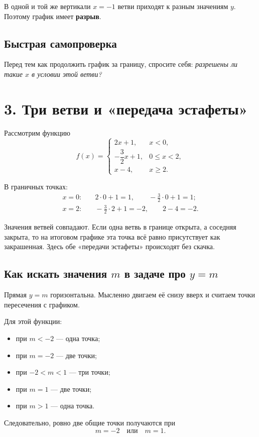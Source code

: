 \documentclass[a4paper,12pt]{article}
\newcommand{\sectionline}{\par\vspace{1mm}{\color{accent}\rule{\linewidth}{0.6pt}}\par\vspace{1mm}}
\newcommand{\key}[1]{\textbf{\color{darkaccent}#1}}
\begin{document}
В одной и той же вертикали $x=-1$ ветви приходят к разным значениям $y$. Поэтому график имеет \key{разрыв}.

\subsection*{Быстрая самопроверка}
Перед тем как продолжить график за границу, спросите себя: \emph{разрешены ли такие $x$ в условии этой ветви?}

\clearpage
\section*{3. Три ветви и «передача эстафеты»}
\sectionline
Рассмотрим функцию
\[
f(x)=
\begin{cases}
2x+1, & x<0,\\
-\dfrac{3}{2}x+1, & 0\le x<2,\\
x-4, & x\ge2.
\end{cases}
\]

В граничных точках:
\[
\begin{aligned}
x=0:&\quad 2\cdot0+1=1,\qquad -\frac32\cdot0+1=1;\\
x=2:&\quad -\frac32\cdot2+1=-2,\qquad 2-4=-2.
\end{aligned}
\]

Значения ветвей совпадают. Если одна ветвь в границе открыта, а соседняя закрыта, то на итоговом графике эта точка всё равно присутствует как закрашенная. Здесь обе «передачи эстафеты» происходят без скачка.

\subsection*{Как искать значения $m$ в задаче про $y=m$}
Прямая $y=m$ горизонтальна. Мысленно двигаем её снизу вверх и считаем точки пересечения с графиком.

Для этой функции:
\begin{itemize}
  \item при $m<-2$ — одна точка;
  \item при $m=-2$ — две точки;
  \item при $-2<m<1$ — три точки;
  \item при $m=1$ — две точки;
  \item при $m>1$ — одна точка.
\end{itemize}

Следовательно, ровно две общие точки получаются при
\[
\boxed{m=-2\quad\text{или}\quad m=1}.
\]
\end{document}
